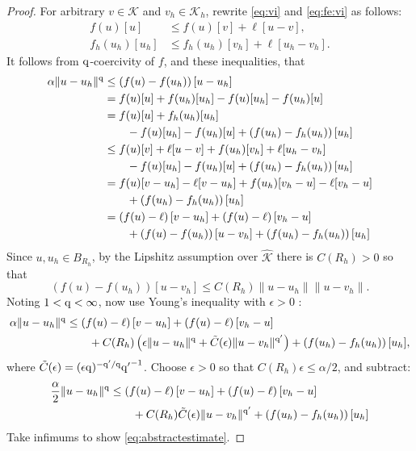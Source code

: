 \documentclass[hidelinks,onefignum,onetabnum,final]{siamart220329}  %
\newcommand{\eps}{\epsilon}
\newcommand{\cK}{\mathcal{K}}
\newcommand{\hcK}{\widehat{\cK}}
\newcommand{\qq}{{\text{\textnormal{q}}}}
\begin{document}
\begin{proof}  For arbitrary $v\in\cK$ and $v_h\in\cK_h$, rewrite \eqref{eq:vi} and \eqref{eq:fe:vi} as follows:
\begin{align*}
f(u)[u]     &\le f(u)[v] + \ell[u-v],  \\
f_h(u_h)[u_h] &\le f_h(u_h)[v_h] + \ell[u_h-v_h].
\end{align*}
It follows from $\qq$-coercivity of $f$, and these inequalities, that
\begin{align*}
\alpha \|u-u_h\|^\qq &\le \left(f(u)-f(u_h)\right)[u-u_h] \\
  &= f(u)[u] + f(u_h)[u_h] - f(u)[u_h] - f(u_h)[u] \\
  &= f(u)[u] + f_h(u_h)[u_h] \\
  &\qquad - f(u)[u_h] - f(u_h)[u] + \left(f(u_h)-f_h(u_h)\right)[u_h] \\
  &\le f(u)[v] + \ell[u-v] + f(u_h)[v_h] + \ell[u_h-v_h] \\
  &\qquad - f(u)[u_h] - f(u_h)[u] + \left(f(u_h)-f_h(u_h)\right)[u_h] \\
  &= f(u)[v-u_h] - \ell[v-u_h] + f(u_h)[v_h-u] - \ell[v_h-u] \\
  &\qquad + \left(f(u_h)-f_h(u_h)\right)[u_h] \\
  &= \left(f(u)-\ell\right)[v-u_h] + \left(f(u)-\ell\right)[v_h-u] \\
  &\qquad + \left(f(u)-f(u_h)\right)[u-v_h] + \left(f(u_h)-f_h(u_h)\right)[u_h]
\end{align*}
Since $u,u_h\in B_{R_h}$, by the Lipshitz assumption over $\hcK$ there is $C(R_h)>0$ so that
    $$\left(f(u)-f(u_h)\right)[u-v_h] \le C(R_h) \|u-u_h\|\|u-v_h\|.$$
Noting $1<\qq<\infty$, now use Young's inequality with $\eps>0$ \cite[Appendix B.2]{Evans2010}:
\begin{align*}
\alpha \|u-u_h\|^\qq &\le \left(f(u)-\ell\right)[v-u_h] + \left(f(u)-\ell\right)[v_h-u] \\
  &\qquad + C(R_h) \left(\eps\|u-u_h\|^\qq + \tilde C(\eps) \|u-v_h\|^{\qq'}\right) + \left(f(u_h)-f_h(u_h)\right)[u_h],
\end{align*}
where $\tilde C(\eps) = (\eps \qq)^{-\qq'/\qq} {\qq'}^{-1}$.  Choose $\eps>0$ so that $C(R_h) \eps \le \alpha/2$, and subtract:
\begin{align*}
\frac{\alpha}{2} \|u-u_h\|^\qq &\le \left(f(u)-\ell\right)[v-u_h] + \left(f(u)-\ell\right)[v_h-u] \\
  &\qquad + C(R_h) \tilde C(\eps) \|u-v_h\|^{\qq'} + \left(f(u_h)-f_h(u_h)\right)[u_h]
\end{align*}
Take infimums to show \eqref{eq:abstractestimate}.
\end{proof}
\end{document}
